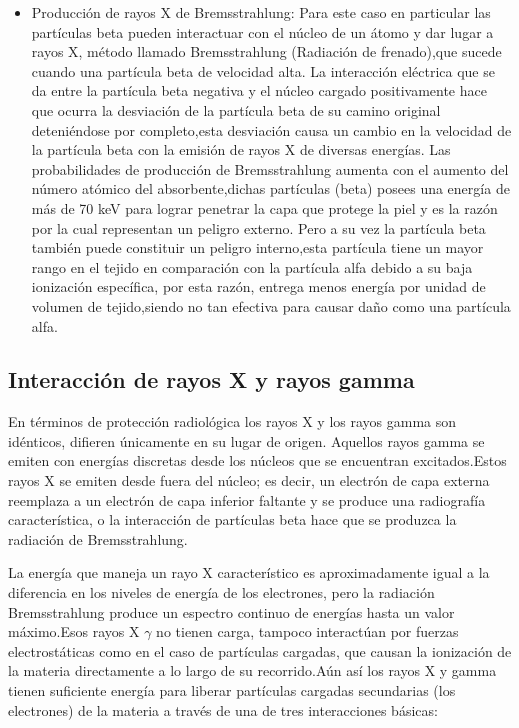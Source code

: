 \documentclass[12pt,fleqn]{book} %
\numberwithin{equation}{section} %
\numberwithin{figure}{section} %
\numberwithin{table}{section} %
\begin{document}
{\begin{itemize}
 \item Producción de rayos X de Bremsstrahlung:
Para este caso en particular las partículas beta pueden interactuar con el núcleo de un átomo y dar lugar a rayos X, método llamado Bremsstrahlung (Radiación de frenado),que sucede cuando una partícula beta de velocidad alta. La interacción eléctrica que se da entre la partícula beta negativa y el núcleo cargado positivamente hace que ocurra la desviación de la partícula beta de su camino original deteniéndose  por completo,esta desviación causa un cambio en la velocidad  de la partícula beta con la emisión de rayos X de diversas energías. Las probabilidades de producción de Bremsstrahlung aumenta con el aumento del número atómico del absorbente,dichas partículas (beta) posees una energía de más de 70 keV para lograr penetrar la capa que protege la piel y es la razón por la cual representan un peligro externo. Pero a su vez la partícula beta también puede constituir un peligro interno,esta partícula tiene un mayor rango en el tejido en comparación con la partícula alfa debido a su baja ionización específica, por esta razón, entrega menos energía por unidad de volumen de tejido,siendo no tan efectiva para causar daño como una partícula alfa.
\end{itemize}

\subsection{Interacción de rayos X y rayos gamma}
En términos de protección radiológica los rayos X y los rayos gamma son idénticos, difieren únicamente en su lugar de origen. Aquellos rayos gamma se emiten con energías discretas desde los núcleos que se encuentran excitados.Estos rayos X se emiten desde fuera del núcleo; es decir, un electrón de capa externa reemplaza a un electrón de capa inferior faltante y se produce una radiografía característica, o la interacción de partículas beta hace que se produzca la radiación de Bremsstrahlung. 

La energía que maneja un rayo X característico es aproximadamente igual a la diferencia en los niveles de energía de los electrones, pero la radiación Bremsstrahlung produce un espectro continuo de energías hasta un valor máximo.Esos rayos X $\gamma$ no tienen carga, tampoco interactúan por fuerzas electrostáticas como en el caso de partículas cargadas, que causan la ionización de la materia directamente a lo largo de su recorrido.Aún así los rayos X y gamma tienen suficiente energía para liberar partículas cargadas secundarias (los electrones) de la materia a través de una de tres interacciones básicas: 

}
\end{document}
